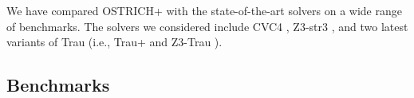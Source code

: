 
We have compared OSTRICH+ with the state-of-the-art solvers on a wide range of benchmarks. The solvers we considered include CVC4 \cite{cvc4}, Z3-str3 \cite{Z3-str}, and two latest variants of Trau (i.e., Trau+ \cite{AbdullaA+19} and Z3-Trau \cite{Z3-trau}).



\subsection{Benchmarks}
 

